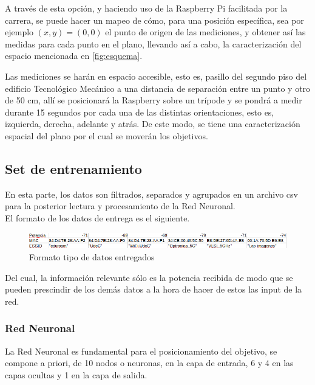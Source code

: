 \begin{itemize}
    A través de esta opción, y haciendo uso de la Raspberry Pi facilitada por la carrera, se puede hacer un mapeo de cómo, para una posición específica, sea por ejemplo $(x,y) = (0,0)$ el punto de origen de las mediciones, y obtener así las medidas para cada punto en el plano, llevando así a cabo, la caracterización del espacio mencionada en \ref{fig:esquema}.
\end{itemize}

\newpage

Las mediciones se harán en espacio accesible, esto es, pasillo del segundo piso del edificio Tecnológico Mecánico a una distancia de separación entre un punto y otro de 50 cm, allí se posicionará la Raspberry sobre un trípode y se pondrá a medir durante 15 segundos por cada una de las distintas orientaciones, esto es, izquierda, derecha, adelante y atrás. De este modo, se tiene una caracterización espacial del plano por el cual se moverán los objetivos.\\


\subsection{Set de entrenamiento}
En esta parte, los datos son filtrados, separados y agrupados en un archivo csv para la posterior lectura y procesamiento de la Red Neuronal.\\

El formato de los datos de entrega es el siguiente.
\begin{figure}[h!]
    \centering
    \includegraphics[scale=0.5]{./images/datos}
    \caption{Formato tipo de datos entregados }
    \label{fig:datos}
\end{figure}

Del cual, la información relevante sólo es la potencia recibida de modo que se pueden prescindir de los demás datos a la hora de hacer de estos las input de la red.

\subsubsection{Red Neuronal}
La Red Neuronal es fundamental para el posicionamiento del objetivo, se compone a priori, de 10 nodos o neuronas, en la capa de entrada, 6 y 4 en las capas ocultas y 1 en la capa de salida.\\

